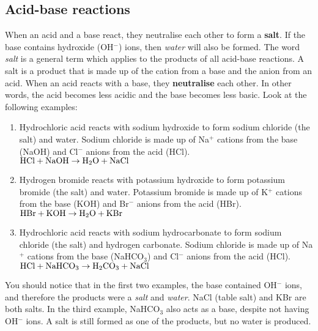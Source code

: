 \subsection{Acid-base reactions}

When an acid and a base react, they neutralise each other to form a \textbf{salt}. If the base contains hydroxide (OH$^{-}$)  ions, then \textit{water} will also be formed. The word \textit{salt} is a general term which applies to the products of all acid-base reactions. A salt is a product that is made up of the cation from a base and the anion from an acid. When an acid reacts with a base, they \textbf{neutralise} each other. In other words, the acid becomes less acidic and the base becomes less basic. Look at the following examples:\\

\begin{enumerate}
\item{Hydrochloric acid reacts with sodium hydroxide to form sodium chloride (the salt) and water. Sodium chloride is made up of Na$^{+}$ cations from the base (NaOH) and Cl$^{-}$ anions from the acid (HCl). \\

$\rm{HCl + NaOH \rightarrow H_{2}O + NaCl}$
}

\item{Hydrogen bromide reacts with potassium hydroxide to form potassium bromide (the salt) and water. Potassium bromide is made up of K$^{+}$ cations from the base (KOH) and Br$^{-}$ anions from the acid (HBr).\\

$\rm{HBr + KOH \rightarrow H_{2}O +KBr}$
}

\item{Hydrochloric acid reacts with sodium hydrocarbonate to form sodium chloride (the salt) and hydrogen carbonate. Sodium chloride is made up of Na$^{+}$ cations from the base (NaHCO$_{3}$) and Cl$^{-}$ anions from the acid (HCl).\\

$\rm{HCl + NaHCO_{3} \rightarrow H_{2}CO_{3} + NaCl}$
}
\end{enumerate} 

You should notice that in the first two examples, the base contained OH$^{-}$ ions, and therefore the products were a \textit{salt} and \textit{water}. NaCl (table salt) and KBr are both salts. In the third example, NaHCO$_{3}$ also acts as a base, despite not having OH$^{-}$ ions. A salt is still formed as one of the products, but no water is produced.\\

